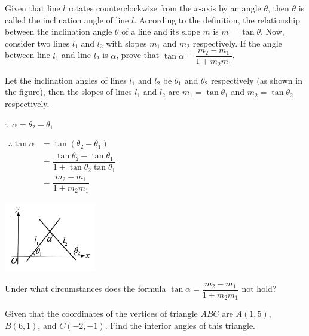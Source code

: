 \documentclass{report}
\begin{document}
\begin{question}
	Given that line $l$ rotates counterclockwise from the $x$-axis by an angle $\theta$, then $\theta$ is called the inclination angle of line $l$. According to the definition, the relationship between the inclination angle $\theta$ of a line and its slope $m$ is $m=\tan \theta$. Now, consider two lines $l_1$ and $l_2$ with slopes $m_1$ and $m_2$ respectively. If the angle between line $l_1$ and line $l_2$ is $\alpha$, prove that $\tan \alpha=\dfrac{m_2-m_1}{1+m_2 m_1}$.
	
	\sol{}
	
	\begin{multicols}{2}
		\noindent Let the inclination angles of lines $l_1$ and $l_2$ be $\theta_1$ and $\theta_2$ respectively (as shown in the figure), then the slopes of lines $l_1$ and $l_2$ are $m_1=\tan \theta_1$ and $m_2=\tan \theta_2$ respectively.
		
		\noindent $\because$ $\alpha = \theta_2 - \theta_1$
		
		\noindent $\begin{aligned} \therefore \tan \alpha & =\tan \left(\theta_2-\theta_1\right) \\ & =\dfrac{\tan \theta_2-\tan \theta_1}{1+\tan \theta_2 \tan \theta_1} \\ & =\dfrac{m_2-m_1}{1+m_2 m_1}\end{aligned}$
		
		\begin{center}
			\includegraphics[width=0.3\textwidth]{assets/11-5.jpg}
		\end{center}
	\end{multicols}
\end{question}

\begin{think}
	    
	\noindent Under what circumstances does the formula $\tan \alpha=\dfrac{m_2-m_1}{1+m_2 m_1}$ not hold?
\end{think}


Given that the coordinates of the vertices of triangle $ABC$ are $A(1,5)$, $B(6,1)$, and $C(-2,-1)$. Find the interior angles of this triangle.
\end{document}
